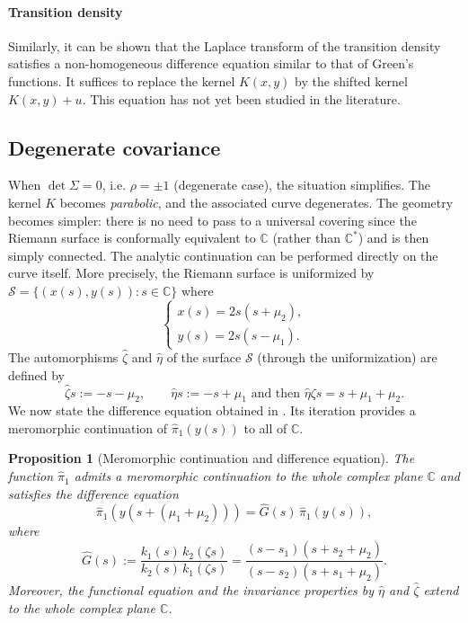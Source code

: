 \documentclass[11pt]{article}
\newtheorem{prop}[thm]{Proposition}
\theoremstyle{definition}
\begin{document}
\paragraph{Transition density}

Similarly, it can be shown that the Laplace transform of the transition density satisfies a non-homogeneous difference equation similar to that of Green's functions. It suffices to replace the kernel $K(x,y)$ by the shifted kernel $K(x,y)+u$. This equation has not yet been studied in the literature.

\subsection{Degenerate covariance}


When $\det\Sigma=0$, i.e. $\rho=\pm 1$ (degenerate case), the situation simplifies. The kernel $K$ becomes \emph{parabolic}, and the associated curve degenerates. 
The geometry becomes simpler: there is no need to pass to a universal covering since the Riemann surface is conformally equivalent to $\mathbb{C}$ (rather than $\mathbb{C}^*$) and is then simply connected. The analytic continuation can be performed directly on the curve itself.
More precisely, the Riemann surface is uniformized by $\mathcal{S}=\{(x(s), y(s)): s \in \mathbb{C} \}$ where
$$
\left\{\begin{array}{l}
x(s)=2 s\left(s+\mu_2\right), \\[1.2ex]
y(s)=2 s\left(s-\mu_1\right).
\end{array}\right .
$$
The automorphisms $\widehat \zeta$ and $\widehat \eta$ of the surface $\mathcal{S}$ (through the uniformization) are defined by
$$
\widehat\zeta s:=-s-\mu_2, \quad\quad \widehat\eta s:=-s+\mu_1 \text { and then } \widehat\eta\zeta s = s +\mu_1+\mu_2.
$$
We now state the difference equation obtained in \cite{franceschi_degenerate_asym_2025}. Its iteration provides a meromorphic continuation of $\widehat \pi_1 (y(s))$ to all of $\mathbb{C}$.
\begin{prop}[Meromorphic continuation and difference equation]
The function $\widehat \pi_1$ admits a meromorphic continuation to the whole complex plane $\mathbb{C}$ and satisfies the difference equation
\[
\widehat \pi_1(y(s+(\mu_1+\mu_2)))=\widehat G(s)\,\widehat \pi_1(y(s)),
\]
where
\[
\widehat G(s):=\frac{k_1(s)\,k_2(\zeta s)}{k_2(s)\,k_1(\zeta s)}
=\frac{(s-s_1)(s+s_2+\mu_2)}{(s-s_2)(s+s_1+\mu_2)}.
\]
Moreover, the functional equation and the invariance properties by $\widehat\eta$ and $\widehat\zeta$ extend to the whole complex plane $\mathbb{C}$.
\end{prop}
\end{document}
